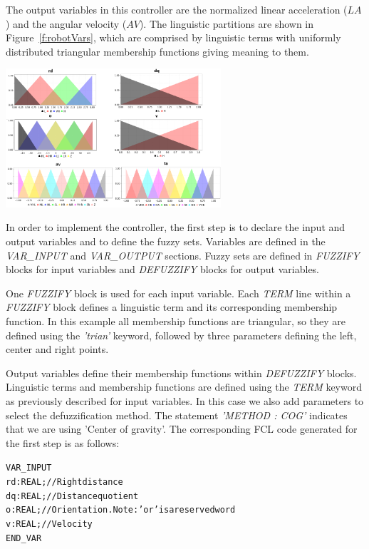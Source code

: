 \documentclass[11pt,twoside]{article}
\begin{document}
\begin{multicols}{2}
The output variables in this controller are the normalized linear acceleration ($LA$) and the angular velocity ($AV$). The linguistic partitions are shown in Figure~\ref{f:robotVars}, which are comprised by linguistic terms with uniformly distributed triangular membership functions giving meaning to them.

\vspace*{8pt}
\centerline{\includegraphics[width=3.15in]{./figs/robot_vars_2.png}}
\vspace*{5pt}
\label{f:robotVars}
\vspace*{8pt}

In order to implement the controller, the first step is to declare the input and output variables and to define the fuzzy sets. Variables are defined in the \textit{VAR\_INPUT} and \textit{VAR\_OUTPUT} sections. Fuzzy sets are defined in \textit{FUZZIFY} blocks for input variables and \textit{DEFUZZIFY} blocks for output variables.

One \textit{FUZZIFY} block is used for each input variable. Each \textit{TERM} line within a \textit{FUZZIFY} block defines a linguistic term and its corresponding membership function.  In this example all membership functions are triangular, so they are defined using the \textit{'trian'} keyword, followed by three parameters defining the left, center and right points.

Output variables define their membership functions within \textit{DEFUZZIFY} blocks. Linguistic terms and membership functions are defined using the \textit{TERM} keyword as previously described for input variables. In this case we also add parameters to select the defuzzification method. The statement \textit{'METHOD : COG'} indicates that we are using 'Center of gravity'. The corresponding FCL code generated for the first step is as follows:

\vspace*{5pt}
\begin{scriptsize}
\begin{alltt}
VAR\_INPUT
	rd : REAL;			// Right distance
	dq : REAL;			// Distance quotient
	o  : REAL;			// Orientation. Note: 'or' is a reserved word
	v  : REAL;			// Velocity
END\_VAR


\end{alltt}
\end{scriptsize}
\end{multicols}
\end{document}
